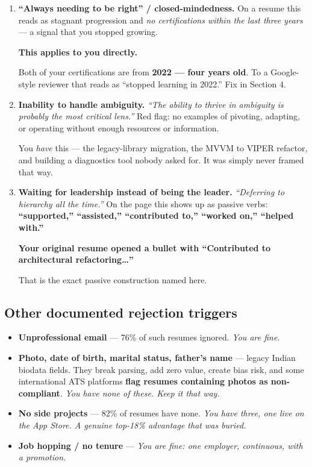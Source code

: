 \documentclass[11pt,a4paper]{article}
\newcommand{\keyfinding}[1]{\par\vspace{3pt}\noindent\textcolor{warn}{\textbf{#1}}\par\vspace{2pt}}
\begin{document}
\begin{enumerate}
  \item \textbf{``Always needing to be right'' / closed-mindedness.} On a resume this reads as
        stagnant progression and \emph{no certifications within the last three years} --- a
        signal that you stopped growing.

        \keyfinding{This applies to you directly.}
        Both of your certifications are from \textbf{2022 --- four years old}. To a
        Google-style reviewer that reads as ``stopped learning in 2022.'' Fix in Section 4.

  \item \textbf{Inability to handle ambiguity.} \emph{``The ability to thrive in ambiguity is
        probably the most critical lens.''} Red flag: no examples of pivoting, adapting, or
        operating without enough resources or information.

        You \emph{have} this --- the legacy-library migration, the MVVM to VIPER refactor, and
        building a diagnostics tool nobody asked for. It was simply never framed that way.

  \item \textbf{Waiting for leadership instead of being the leader.} \emph{``Deferring to
        hierarchy all the time.''} On the page this shows up as passive verbs:
        \textbf{``supported,'' ``assisted,'' ``contributed to,'' ``worked on,'' ``helped
        with.''}

        \keyfinding{Your original resume opened a bullet with ``Contributed to architectural refactoring\ldots''}
        That is the exact passive construction named here.
\end{enumerate}

\subsection{Other documented rejection triggers}
\begin{itemize}
  \item \textbf{Unprofessional email} --- 76\% of such resumes ignored.
        \emph{You are fine.}
  \item \textbf{Photo, date of birth, marital status, father's name} --- legacy Indian biodata
        fields. They break parsing, add zero value, create bias risk, and some international
        ATS platforms \textbf{flag resumes containing photos as non-compliant}.
        \emph{You have none of these. Keep it that way.}
  \item \textbf{No side projects} --- 82\% of resumes have none. \emph{You have three, one
        live on the App Store. A genuine top-18\% advantage that was buried.}
  \item \textbf{Job hopping / no tenure} --- \emph{You are fine: one employer, continuous,
        with a promotion.}
\end{itemize}
\end{document}
